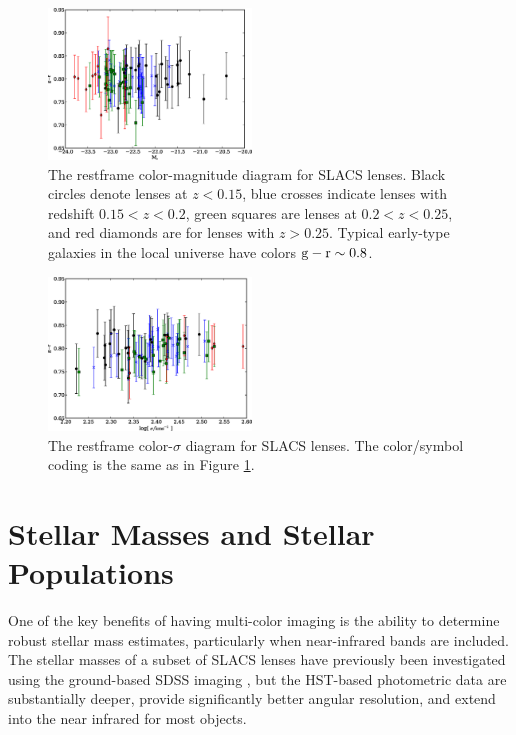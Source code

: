 \documentclass[iop]{emulateapj}
\begin{document}
\begin{figure}[ht]
 \centering
 \includegraphics[width=0.48\textwidth,clip]{f4.eps}
 \caption{The restframe color-magnitude diagram for SLACS lenses. Black circles denote lenses at $z < 0.15$, blue crosses indicate lenses with redshift $0.15 < z < 0.2$, green squares are lenses at $0.2 < z < 0.25$, and red diamonds are for lenses with $z > 0.25$. Typical early-type galaxies in the local universe have colors ${\rm g-r} \sim0.8$.}
 \label{F_color_magnitude}
\end{figure}

\begin{figure}[ht]
 \centering
 \includegraphics[width=0.48\textwidth,clip]{f5.eps}
 \caption{The restframe color-$\sigma$ diagram for SLACS lenses. The color/symbol coding is the same as in Figure \ref{F_color_magnitude}.}
 \label{F_color_sigma}
\end{figure}



\section{Stellar Masses and Stellar Populations}
One of the key benefits of having multi-color imaging is the ability to determine robust stellar mass estimates, particularly when near-infrared bands are included. The stellar masses of a subset of SLACS lenses have previously been investigated using the ground-based SDSS imaging \citep[G09;][]{grillo}, but the HST-based photometric data are substantially deeper, provide significantly better angular resolution, and extend into the near infrared for most objects.
\end{document}

